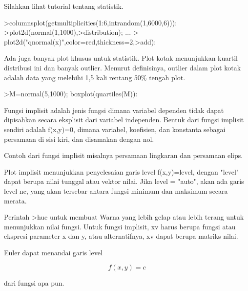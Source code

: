 \documentclass{article}
\begin{document}
\begin{eulernotebook}
\begin{eulercomment}
\begin{eulercomment}
\begin{eulercomment}
\begin{eulercomment}
\begin{eulercomment}
\begin{eulercomment}
\begin{eulercomment}
Silahkan lihat tutorial tentang statistik.
\end{eulercomment}
\begin{eulerprompt}
>columnsplot(getmultiplicities(1:6,intrandom(1,6000,6))):
>plot2d(normal(1,1000),>distribution); ...
>  plot2d("qnormal(x)",color=red,thickness=2,>add):
\end{eulerprompt}
\begin{eulercomment}
Ada juga banyak plot khusus untuk statistik. Plot kotak menunjukkan
kuartil distribusi ini dan banyak outlier. Menurut definisinya,
outlier dalam plot kotak adalah data yang melebihi 1,5 kali rentang
50\% tengah plot.
\end{eulercomment}
\begin{eulerprompt}
>M=normal(5,1000); boxplot(quartiles(M)):
\end{eulerprompt}
\begin{eulercomment}
Fungsi implisit adalah jenis fungsi dimana variabel dependen tidak
dapat dipisahkan secara eksplisit dari variabel independen. Bentuk
dari fungsi implisit sendiri adalah f(x,y)=0, dimana variabel,
koefisien, dan konstanta sebagai persamaan di sisi kiri, dan disamakan
dengan nol.

Contoh dari fungsi implisit misalnya persamaan lingkaran dan persamaan
elips.

Plot implisit menunjukkan penyelesaian garis level f(x,y)=level,
dengan "level" dapat berupa nilai tunggal atau vektor nilai. Jika
level = "auto", akan ada garis level nc, yang akan tersebar antara
fungsi minimum dan maksimum secara merata.

Perintah \textgreater{}hue untuk membuat Warna yang lebih gelap atau lebih terang
untuk menunjukkan nilai fungsi. Untuk fungsi implisit, xv harus berupa
fungsi atau ekspresi parameter x dan y, atau alternatifnya, xv dapat
berupa matriks nilai.

Euler dapat menandai garis level

\end{eulercomment}
\begin{eulerformula}
\[
f(x,y) = c
\]
\end{eulerformula}
\begin{eulercomment}
dari fungsi apa pun.


\end{eulercomment}
\end{eulercomment}
\end{eulercomment}
\end{eulercomment}
\end{eulercomment}
\end{eulercomment}
\end{eulercomment}
\end{eulernotebook}
\end{document}
